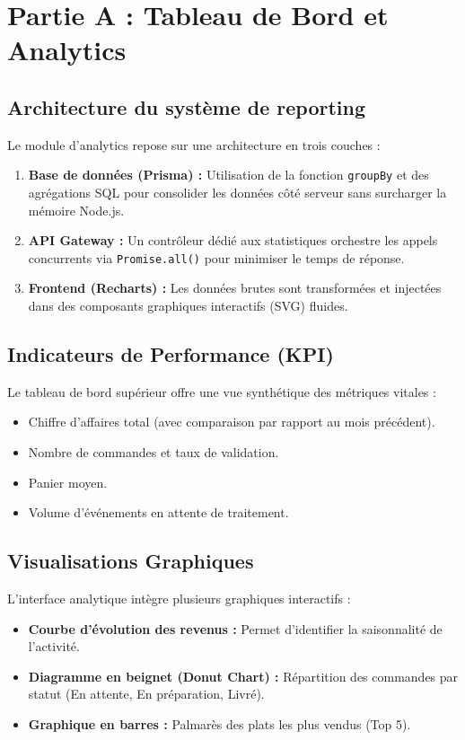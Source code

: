 \section{Partie A : Tableau de Bord et Analytics}

\subsection{Architecture du système de reporting}

Le module d'analytics repose sur une architecture en trois couches :
\begin{enumerate}
    \item \textbf{Base de données (Prisma) :} Utilisation de la fonction \texttt{groupBy} et des agrégations SQL pour consolider les données côté serveur sans surcharger la mémoire Node.js.
    \item \textbf{API Gateway :} Un contrôleur dédié aux statistiques orchestre les appels concurrents via \texttt{Promise.all()} pour minimiser le temps de réponse.
    \item \textbf{Frontend (Recharts) :} Les données brutes sont transformées et injectées dans des composants graphiques interactifs (SVG) fluides.
\end{enumerate}

\subsection{Indicateurs de Performance (KPI)}

Le tableau de bord supérieur offre une vue synthétique des métriques vitales :
\begin{itemize}
    \item Chiffre d'affaires total (avec comparaison par rapport au mois précédent).
    \item Nombre de commandes et taux de validation.
    \item Panier moyen.
    \item Volume d'événements en attente de traitement.
\end{itemize}

\subsection{Visualisations Graphiques}

L'interface analytique intègre plusieurs graphiques interactifs :
\begin{itemize}
    \item \textbf{Courbe d'évolution des revenus :} Permet d'identifier la saisonnalité de l'activité.
    \item \textbf{Diagramme en beignet (Donut Chart) :} Répartition des commandes par statut (En attente, En préparation, Livré).
    \item \textbf{Graphique en barres :} Palmarès des plats les plus vendus (Top 5).
\end{itemize}

